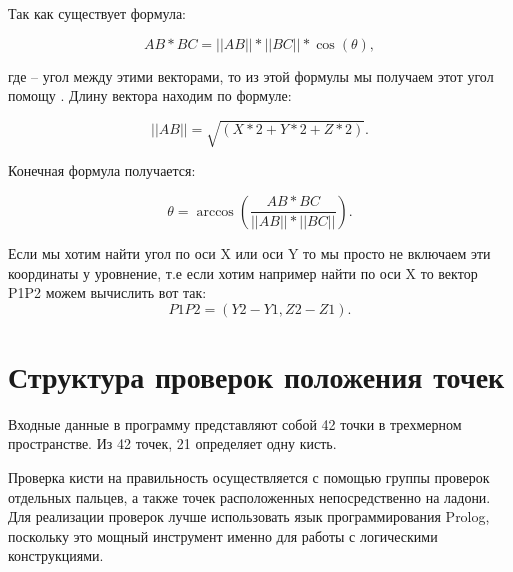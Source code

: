 \hspace{0.6cm} Так как существует формула:

\begin{equation} 
\displaystyle  AB * BC = ||AB|| * ||BC|| * \cos(\theta),
\end{equation}

\hspace{0.6cm} где \theta – угол между этими векторами, то из этой формулы мы получаем этот угол помощу \arccos. Длину вектора находим по формуле:

\begin{equation} 
\displaystyle  ||AB|| = \sqrt{(X*2 + Y*2 + Z*2)}.
\end{equation}

\hspace{0.6cm} Конечная формула получается:

\begin{equation} 
\displaystyle  \theta = \arccos(\frac{AB * BC}{||AB|| * ||BC||}).
\end{equation}

\hspace{0.6cm} Если мы хотим найти угол по оси X или оси Y то мы просто не включаем эти координаты у уровнение, т.е если хотим например найти по оси X то вектор P1P2 можем вычислить вот так:
\begin{equation} 
\displaystyle  P1P2 = (Y2 - Y1, Z2 - Z1).
\end{equation} 
	

\section{Структура проверок положения точек}
\hspace{0.6cm}Входные данные в программу представляют собой 42 точки в трехмерном пространстве. Из 42 точек, 21 определяет одну кисть.

\hspace{0.6cm}Проверка кисти на правильность осуществляется с помощью группы проверок отдельных пальцев, а также точек расположенных непосредственно на ладони. Для реализации проверок лучше использовать язык программирования Prolog, поскольку это мощный инструмент именно для работы с логическими конструкциями.

